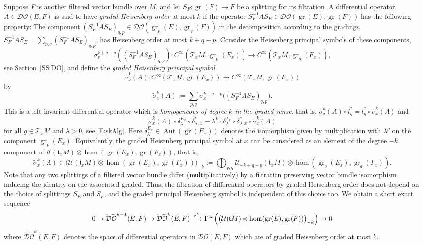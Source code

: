 \documentclass[reqno,12pt]{amsart}
\DeclareMathOperator{\gr}{gr}
\DeclareMathOperator{\Aut}{Aut}
\newcommand{\DO}{\mathcal D\mathcal O}
\newcommand{\tDO}{\widetilde{\DO}}
\theoremstyle{plain}
\theoremstyle{definition}
\begin{document}
Suppose $F$ is another filtered vector bundle over $M$, and let $S_F\colon\gr(F)\to F$ be a splitting for its filtration.
A differential operator $A\in\DO(E,F)$ is said to have \emph{graded Heisenberg order} at most $k$ if the operator $S_F^{-1}AS_E\in\DO(\gr(E),\gr(F))$ has the following property:
The component $(S_F^{-1}AS_E)_{q,p}\in\DO(\gr_p(E),\gr_q(F))$ in the decomposition according to the gradings, $S_F^{-1}AS_E=\sum_{p,q}(S_F^{-1}AS_E)_{q,p}$, has Heisenberg order at most $k+q-p$.
Consider the Heisenberg principal symbols of these components, 
$$
\sigma_x^{k+q-p}((S_F^{-1}AS_E)_{q,p})\colon C^\infty(\mathcal T_xM,\gr_p(E_x))\to C^\infty(\mathcal T_xM,\gr_q(F_x)),
$$ 
see Section~\ref{SS:DO}, and define the \emph{graded Heisenberg principal symbol}
$$
\tilde\sigma_x^k(A)\colon C^\infty(\mathcal T_xM,\gr(E_x))\to C^\infty(\mathcal T_xM,\gr(F_x))
$$
by
$$
\tilde\sigma^k_x(A):=\sum_{p,q}\sigma^{k+q-p}_x\bigl((S_F^{-1}AS_E)_{q,p}\bigr).
$$
This is a left invariant differential operator which is \emph{homogeneous of degree $k$ in the graded sense}, that is, $\tilde\sigma^k_x(A)\circ l_g^*=l_g^*\circ\tilde\sigma_x^k(A)$ and
$$
\tilde\sigma^k_x(A)\circ\delta^{E_x}_\lambda\circ\delta_{\lambda,x}^*
=\lambda^k\cdot\delta^{F_x}_\lambda\circ\delta_{\lambda,x}^*\circ\tilde\sigma^k_x(A)
$$
for all $g\in\mathcal T_xM$ and $\lambda>0$, see \eqref{E:skAlg}.
Here $\delta^{E_x}_\lambda\in\Aut(\gr(E_x))$ denotes the isomorphism given by multiplication with $\lambda^p$ on the component $\gr_p(E_x)$.
Equivalently, the graded Heisenberg principal symbol at $x$ can be considered as an element of the degree $-k$ component of $\mathcal U(\mathfrak t_xM)\otimes\hom(\gr(E_x),\gr(F_x))$, that is,
$$
\tilde\sigma^k_x(A)\in
\bigl(\mathcal U(\mathfrak t_xM)\otimes\hom(\gr(E_x),\gr(F_x))\bigr)_{-k}
:=
\bigoplus_{p,q}\mathcal U_{-k+q-p}(\mathfrak t_xM)\otimes\hom(\gr_p(E_x),\gr_q(F_x)).
$$
Note that any two splittings of a filtered vector bundle differ (multiplicatively) by a filtration preserving vector bundle isomorphism inducing the identity on the associated graded.
Thus, the filtration of differential operators by graded Heisenberg order does not depend on the choice of splittings $S_E$ and $S_F$, and the graded principal Heisenberg symbol is independent of this choice too.
We obtain a short exact sequence
$$
0\to\tDO^{k-1}(E,F)\to\tDO^k(E,F)\xrightarrow{\tilde\sigma^k}\Gamma^\infty\Bigl(\bigl(\mathcal U(\mathfrak tM)\otimes\hom(\gr(E),\gr(F))\bigr)_{-k}\Bigr)\to0
$$
where $\tDO^k(E,F)$ denotes the space of differential operators in $\DO(E,F)$ which are of graded Heisenberg order at most $k$.
\end{document}
